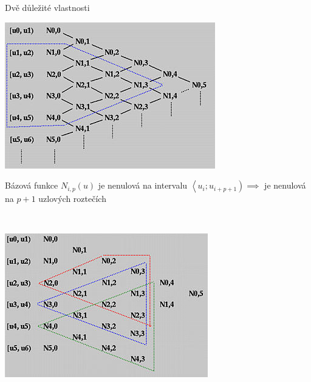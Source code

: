 \documentclass[hyperref={unicode}]{beamer}
\begin{document}
\begin{frame}{Dvě důležité vlastnosti}

\begin{minipage}{0.4\textwidth}
\includegraphics[width=\linewidth]{obrazky/bs-back.jpg}
\end{minipage}
\begin{minipage}{0.55\textwidth}\raggedright
Bázová funkce $N_{i,p}\left(u\right)$ je nenulová na intervalu $\left\langle u_i;u_{i+p+1} \right) \implies$ je nenulová na $p+1$ uzlových roztečích
\end{minipage}
\\\medskip
\begin{minipage}{0.4\textwidth}
\includegraphics[width=\linewidth]{obrazky/bs-non-0.jpg}

\end{minipage}
\end{frame}
\end{document}
